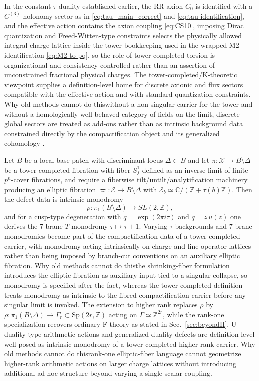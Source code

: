 \documentclass[11pt]{article}
\theoremstyle{remark}
\newcommand{\C}{\mathbb{C}}
\newcommand{\Z}{\mathbb{Z}}
\begin{document}
In the constant-\(\tau\) duality established earlier, the RR axion \(C_{0}\) is identified with a \(C^{(3)}\) holonomy sector as in \eqref{eq:tau_main_correct} and \eqref{eq:tau-identification}, and the effective action contains the axion coupling \eqref{eq:CS10}, imposing Dirac quantization and Freed-Witten-type constraints selects the physically allowed integral charge lattice inside the tower bookkeeping used in the wrapped M2 identification \eqref{eq:M2-to-pq}, so the role of tower-completed torsion is organizational and consistency-controlled rather than an assertion of unconstrained fractional physical charges. The tower-completed/K-theoretic viewpoint supplies a definition-level home for discrete axionic and flux sectors compatible with the effective action and with standard quantization constraints. Why old methods cannot do this\:without a non-singular carrier for the tower and without a homologically well-behaved category of fields on the limit, discrete global sectors are treated as add-ons rather than as intrinsic background data constrained directly by the compactification object and its generalized cohomology \cite{FreedHopkinsTeleman2008}.

Let \(B\) be a local base patch with discriminant locus \(\Delta\subset B\) and let \(\pi:\mathcal{X}\to B\setminus\Delta\) be a tower-completed fibration with fiber \(S_f^{1}\) defined as an inverse limit of finite \(p^{n}\)-cover fibrations, and require a fiberwise tilt/untilt/analytification machinery producing an elliptic fibration \(\varpi:\mathcal{E}\to B\setminus\Delta\) with \(\mathcal{E}_b\simeq \C/(\Z+\tau(b)\Z)\). Then the defect data is intrinsic monodromy
\begin{equation}\label{eq:rho-vary}
\rho:\pi_{1}(B\setminus\Delta)\to SL(2,\Z),
\end{equation}
and for a cusp-type degeneration with \(q=\exp(2\pi i\tau)\) and \(q=z\,u(z)\) one derives the 7-brane \(T\)-monodromy \(\tau\mapsto \tau+1\). Varying-\(\tau\) backgrounds and 7-brane monodromies become part of the compactification data of a tower-completed carrier, with monodromy acting intrinsically on charge and line-operator lattices rather than being imposed by branch-cut conventions on an auxiliary elliptic fibration. Why old methods cannot do this\:the shrinking-fiber formulation introduces the elliptic fibration as auxiliary input tied to a singular collapse, so monodromy is specified after the fact, whereas the tower-completed definition treats monodromy as intrinsic to the fibred compactification carrier before any singular limit is invoked. The extension to higher rank replaces \(\rho\) by \(\rho:\pi_{1}(B\setminus\Delta)\to \Gamma_{r}\subset \mathrm{Sp}(2r,\Z)\) acting on \(\Gamma\simeq\Z^{2r}\), while the rank-one specialization recovers ordinary F-theory as stated in Sec.~\ref{sec:beyondII}. U-duality-type arithmetic actions and generalized duality defects are definition-level well-posed as intrinsic monodromy of a tower-completed higher-rank carrier. Why old methods cannot do this\:rank-one elliptic-fiber language cannot geometrize higher-rank arithmetic actions on larger charge lattices without introducing additional ad hoc structure beyond varying a single scalar coupling.
\end{document}
